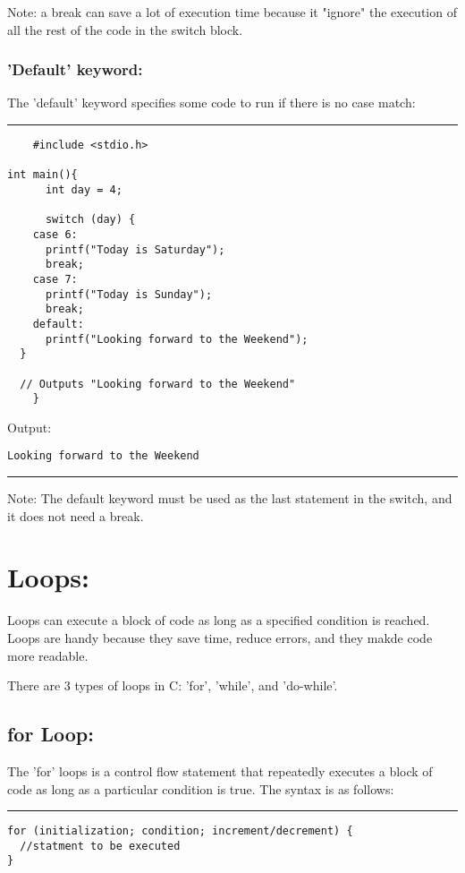 \documentclass[a4paper]{article}
\begin{document}
Note: a break can save a lot of execution time because it "ignore" the execution
of all the rest of the code in the switch block.
\subsubsection{'Default' keyword:}
\label{sec:orgf1426f4}
The 'default' keyword specifies some code to run if there is no case match:

\noindent\rule{\textwidth}{0.5pt}
\begin{verbatim}
    #include <stdio.h>

int main(){
      int day = 4;

      switch (day) {
    case 6:
      printf("Today is Saturday");
      break;
    case 7:
      printf("Today is Sunday");
      break;
    default:
      printf("Looking forward to the Weekend");
  }

  // Outputs "Looking forward to the Weekend"
    }
\end{verbatim}
Output:
\begin{verbatim}
Looking forward to the Weekend
\end{verbatim}

\noindent\rule{\textwidth}{0.5pt}
Note: The default keyword must be used as the last statement in the switch, and
it does not need a break.

\section{Loops:}
\label{sec:org2d11ee1}
Loops can execute a block of code as long as a specified condition is reached.
Loops are handy because they save time, reduce errors, and they makde code more
readable.

There are 3 types of loops in C: 'for', 'while', and 'do-while'.

\subsection{for Loop:}
\label{sec:org6386143}
The 'for' loops is a control flow statement that repeatedly executes a block of
code as long as a particular condition is true. The syntax is as follows:

\noindent\rule{\textwidth}{0.5pt}
\begin{verbatim}
for (initialization; condition; increment/decrement) {
  //statment to be executed
}
\end{verbatim}
\end{document}
